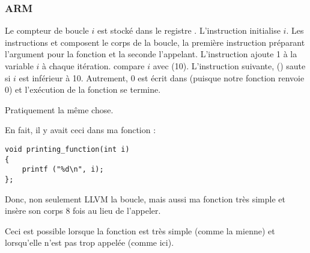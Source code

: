 \subsubsection{ARM}

\myparagraph{\NonOptimizingKeilVI (\ARMMode)}



Le compteur de boucle $i$ est stocké dans le registre .
L'instruction  initialise $i$.
Les instructions  et  composent le corps
de la boucle, la première instruction préparant l'argument pour la fonction \ttf
et la seconde l'appelant.
L'instruction  ajoute 1 à la variable $i$ à chaque itération.
 compare $i$ avec  (10). 
L'instruction suivante,  () saute si $i$ est inférieur
à 10.
Autrement, 0 est écrit dans  (puisque notre fonction renvoie 0) et l'exécution
de la fonction se termine.

\myparagraph{\OptimizingKeilVI (\ThumbMode)}



Pratiquement la même chose.

\myparagraph{\OptimizingXcodeIV (\ThumbTwoMode)}
\label{ARM_unrolled_loops}



En fait, il y avait ceci dans ma fonction \ttf:

\begin{lstlisting}[style=customc]
void printing_function(int i)
{
    printf ("%d\n", i);
};
\end{lstlisting}

Donc, non seulement LLVM  la boucle, mais aussi  ma fonction
très simple et insère son corps 8 fois au lieu de l'appeler.

Ceci est possible lorsque la fonction est très simple (comme la mienne) et lorsqu'elle
n'est pas trop appelée (comme ici).






